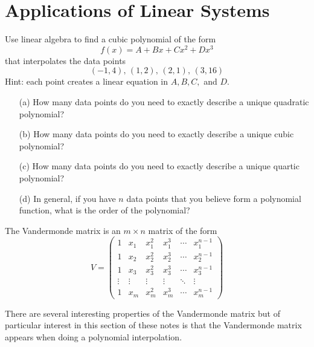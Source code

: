 \section{Applications of Linear Systems}
% 
\begin{problem}
    Use linear algebra to find a cubic polynomial of the form 
    \[ f(x) = A + Bx + Cx^2 + Dx^3 \]
    that interpolates the data points
    \[ (-1,4), \, (1,2), \, (2,1), \, (3,16) \]
    Hint: each point creates a linear equation in $A, B, C,$ and $D$.  
\end{problem}

\begin{problem}
    \begin{enumerate}
        \item[(a)] How many data points do you need to exactly describe a unique quadratic
            polynomial?
        \item[(b)] How many data points do you need to exactly describe a unique cubic
            polynomial?
        \item[(c)] How many data points do you need to exactly describe a unique quartic
            polynomial?
        \item[(d)] In general, if you have $n$ data points that you believe form a
            polynomial function, what is the order of the polynomial?
    \end{enumerate}
\end{problem}

\begin{definition}
    The Vandermonde matrix is an $m \times n$ matrix of the form
    \[ V = \begin{pmatrix} 1 & x_1 & x_1^2 & x_1^3 & \cdots & x_1^{n-1} \\
1 & x_2 & x_2^2 & x_2^3 & \cdots & x_2^{n-1} \\
1 & x_3 & x_3^2 & x_3^3 & \cdots & x_3^{n-1} \\
\vdots & \vdots & \vdots & \vdots & \ddots & \vdots \\
1 & x_m & x_m^2 & x_m^3 & \cdots & x_m^{n-1} \end{pmatrix} \]
\end{definition}
There are several interesting properties of the Vandermonde matrix but of particular
interest in this section of these notes is that the Vandermonde matrix appears when doing
a polynomial interpolation.  


